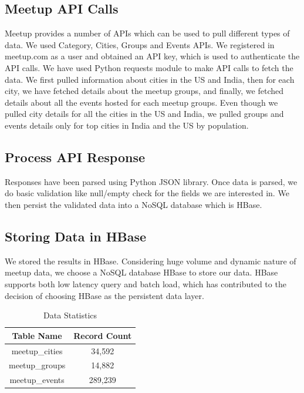\documentclass{acm_proc_article-sp}
\begin{document}
\subsection{Meetup API Calls}
Meetup provides a number of APIs which can be used to pull different types of data. We used Category, Cities, Groups and Events APIs. We registered in meetup.com as a user and obtained an API key, which is used to authenticate the API calls.  We have used Python requests module to make API calls to fetch the data.  We first pulled information about cities in the US and India, then for each city, we have fetched details about the meetup groups, and finally, we fetched details about all the events hosted for each meetup groups.  Even though we pulled city details for all the cities in the US and India, we pulled groups and events details only for top cities in India and the US by population.

\subsection{Process API Response}
Responses have been parsed using Python JSON library. Once data is parsed, we do basic validation like null/empty check for the fields we are interested in.   We then persist the validated data into a NoSQL database which is HBase.

\subsection{Storing Data in HBase}
We stored the results in HBase.  Considering huge volume and  dynamic nature of meetup data, we choose a NoSQL database HBase to store our data.  HBase supports both low latency query and batch load, which has contributed to the decision of choosing HBase as the persistent data layer.

\begin{table}[htb]
\caption{Data Statistics}\label{T:statistics}
\bigskip
\begin{center}
\begin{tabular}{|c|c|} \hline Table Name & Record Count\\ \hline
meetup\_cities & 34,592 \\ \hline
meetup\_groups & 14,882 \\ \hline
meetup\_events & 289,239 \\
\hline\end{tabular}
\end{center}
\end{table}
\end{document}
